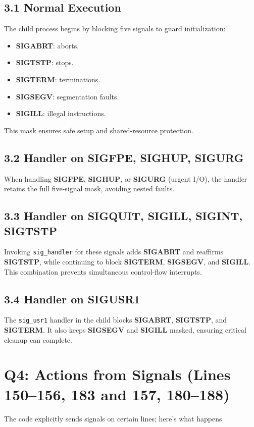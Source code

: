 \documentclass[12pt]{article}
\begin{document}
	\subsection*{3.1 Normal Execution}
	The child process begins by blocking five signals to guard initialization:
	\begin{itemize}
		\item \textbf{SIGABRT}: aborts.
		\item \textbf{SIGTSTP}: stops.
		\item \textbf{SIGTERM}: terminations.
		\item \textbf{SIGSEGV}: segmentation faults.
		\item \textbf{SIGILL}: illegal instructions.
	\end{itemize}
	This mask ensures safe setup and shared-resource protection.
	
	\subsection*{3.2 Handler on SIGFPE, SIGHUP, SIGURG}
	When handling \textbf{SIGFPE}, \textbf{SIGHUP}, or \textbf{SIGURG} (urgent I/O), the handler retains the full five-signal mask, avoiding nested faults.
	
	\subsection*{3.3 Handler on SIGQUIT, SIGILL, SIGINT, SIGTSTP}
	Invoking \texttt{sig\_handler} for these signals adds \textbf{SIGABRT} and reaffirms \textbf{SIGTSTP}, while continuing to block \textbf{SIGTERM}, \textbf{SIGSEGV}, and \textbf{SIGILL}. This combination prevents simultaneous control-flow interrupts.
	
	\subsection*{3.4 Handler on SIGUSR1}
	The \texttt{sig\_usr1} handler in the child blocks \textbf{SIGABRT}, \textbf{SIGTSTP}, and \textbf{SIGTERM}. It also keeps \textbf{SIGSEGV} and \textbf{SIGILL} masked, ensuring critical cleanup can complete.
	
	\section*{Q4: Actions from Signals (Lines 150--156, 183 and 157, 180--188)}
	The code explicitly sends signals on certain lines; here’s what happens.
	
\end{document}
